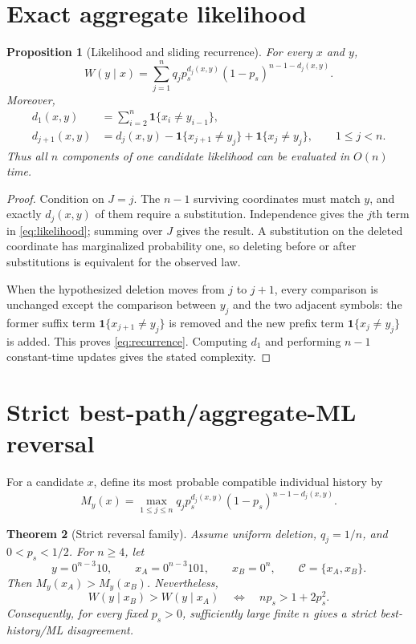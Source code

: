 \documentclass[11pt]{article}
\newtheorem{theorem}{Theorem}
\newtheorem{proposition}[theorem]{Proposition}
\theoremstyle{remark}
\newcommand{\C}{\mathcal C}
\newcommand{\ind}{\mathbf 1}
\begin{document}
\section{Exact aggregate likelihood}

\begin{proposition}[Likelihood and sliding recurrence]
For every $x$ and $y$,
\begin{equation}
 W(y\mid x)=\sum_{j=1}^{n}q_jp_s^{d_j(x,y)}(1-p_s)^{n-1-d_j(x,y)}.
 \label{eq:likelihood}
\end{equation}
Moreover,
\begin{align}
 d_1(x,y)&=\sum_{i=2}^{n}\ind\{x_i\ne y_{i-1}\},\\
 d_{j+1}(x,y)&=d_j(x,y)-\ind\{x_{j+1}\ne y_j\}+\ind\{x_j\ne y_j\},
 \qquad 1\le j<n.
 \label{eq:recurrence}
\end{align}
Thus all $n$ components of one candidate likelihood can be evaluated in $O(n)$ time.
\end{proposition}

\begin{proof}
Condition on $J=j$. The $n-1$ surviving coordinates must match $y$, and exactly
$d_j(x,y)$ of them require a substitution. Independence gives the $j$th term in
\eqref{eq:likelihood}; summing over $J$ gives the result. A substitution on the deleted
coordinate has marginalized probability one, so deleting before or after substitutions
is equivalent for the observed law.

When the hypothesized deletion moves from $j$ to $j+1$, every comparison is unchanged
except the comparison between $y_j$ and the two adjacent symbols: the former suffix term
$\ind\{x_{j+1}\ne y_j\}$ is removed and the new prefix term
$\ind\{x_j\ne y_j\}$ is added. This proves \eqref{eq:recurrence}. Computing $d_1$ and
performing $n-1$ constant-time updates gives the stated complexity.
\end{proof}

\section{Strict best-path/aggregate-ML reversal}

For a candidate $x$, define its most probable compatible individual history by
\[
 M_y(x)=\max_{1\le j\le n}q_jp_s^{d_j(x,y)}(1-p_s)^{n-1-d_j(x,y)}.
\]

\begin{theorem}[Strict reversal family]
Assume uniform deletion, $q_j=1/n$, and $0<p_s<1/2$. For $n\ge4$, let
\[
 y=0^{n-3}10,\qquad x_A=0^{n-3}101,\qquad x_B=0^n,
 \qquad \C=\{x_A,x_B\}.
\]
Then $M_y(x_A)>M_y(x_B)$. Nevertheless,
\[
 W(y\mid x_B)>W(y\mid x_A)
 \quad\Longleftrightarrow\quad
 np_s>1+2p_s^2.
\]
Consequently, for every fixed $p_s>0$, sufficiently large finite $n$ gives a strict
best-history/ML disagreement.
\end{theorem}
\end{document}
